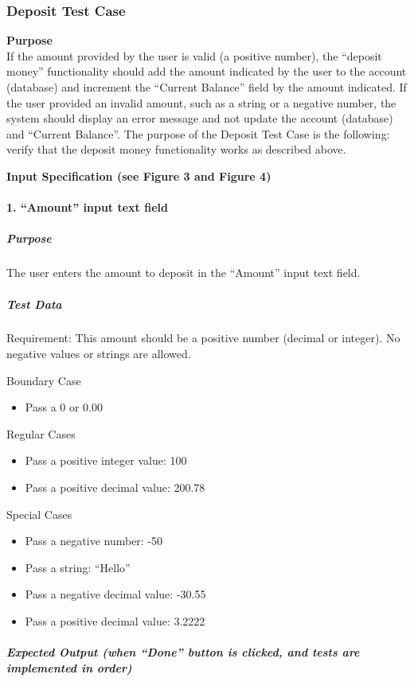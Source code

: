 \documentclass[12pt]{article}
\begin{document}
\subsubsection{Deposit Test Case} \label{tc:1}

\noindent
{\bf Purpose}\\
If the amount provided by the user is valid (a positive number), the “deposit money” functionality should add the amount indicated by the user to the account (database) and increment the “Current Balance” field by the amount indicated.  If the user provided an invalid amount, such as a string or a negative number, the system should display an error message and not update the account (database) and “Current Balance”.  The purpose of the Deposit Test Case is the following: verify that the deposit money functionality works as described above.

\noindent
{\bf Input Specification (see Figure 3 and Figure 4)}

\paragraph{1. “Amount” input text field}
\subparagraph{Purpose} The user enters the amount to deposit in the “Amount” input text field.

\subparagraph{Test Data} Requirement: This amount should be a positive number (decimal or integer). No negative values or strings are allowed.

Boundary Case
\begin{itemize}
  \item Pass a 0 or 0.00
\end{itemize}

Regular Cases
\begin{itemize}
  \item Pass a positive integer value: 100
  \item Pass a positive decimal value: 200.78
\end{itemize}

Special Cases
\begin{itemize}
  \item Pass a negative number: -50
  \item Pass a string: “Hello”
  \item Pass a negative decimal value: -30.55
  \item Pass a positive decimal value: 3.2222
\end{itemize}

\subparagraph{Expected Output (when “Done” button is clicked, and tests are implemented in order)}
\end{document}
